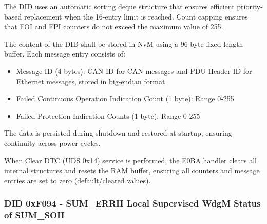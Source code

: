 The DID uses an automatic sorting deque structure that ensures efficient priority-based replacement when the 16-entry limit is reached. Count capping ensures that FOI and FPI counters do not exceed the maximum value of 255.

{}


The content of the DID shall be stored in NvM using a 96-byte fixed-length buffer. Each message entry consists of:
\begin{itemize}
    \item Message ID (4 bytes): CAN ID for CAN messages and PDU Header ID for Ethernet messages, stored in big-endian format
    \item Failed Continuous Operation Indication Count (1 byte): Range 0-255
    \item Failed Protection Indication Counts (1 byte): Range 0-255
\end{itemize}

The data is persisted during shutdown and restored at startup, ensuring continuity across power cycles.

{}


When Clear DTC (UDS 0x14) service is performed, the E0BA handler clears all internal structures and resets the RAM buffer, ensuring all counters and message entries are set to zero (default/cleared values).

{}


\subsubsection{DID 0xF094 - SUM_ERRH Local Supervised WdgM Status of SUM_SOH}


